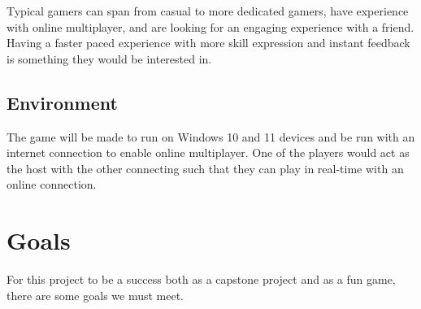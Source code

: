 \documentclass{article}
\begin{document}
Typical gamers can span from casual to more dedicated gamers, have experience with online multiplayer, and are looking for an engaging experience with a friend. Having a faster paced experience with more skill expression and instant feedback is something they would be interested in.


\subsection{Environment}


The game will be made to run on Windows 10 and 11 devices and be run with an internet connection to enable online multiplayer. One of the players would act as the host with the other connecting such that they can play in real-time with an online connection.

\section{Goals}

For this project to be a success both as a capstone project and as a fun game, there are some goals we must meet.
\end{document}
